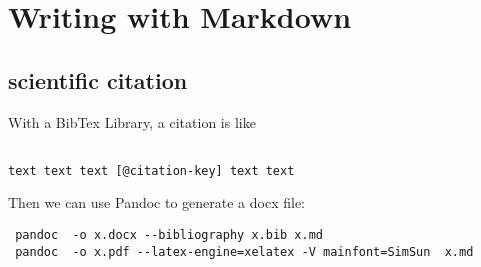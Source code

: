 \section{Writing with Markdown}

\subsection{scientific citation}

With a BibTex Library, a citation is like 
\begin{verbatim}

text text text [@citation-key] text text

\end{verbatim}

Then we can use Pandoc to generate a docx file:

\begin{verbatim}
 pandoc  -o x.docx --bibliography x.bib x.md
 pandoc  -o x.pdf --latex-engine=xelatex -V mainfont=SimSun  x.md
\end{verbatim}
